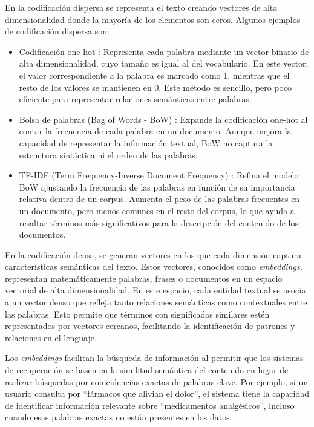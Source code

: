 En la codificación dispersa se representa el texto creando vectores de alta dimensionalidad donde la mayoría de los elementos son ceros. Algunos ejemplos de codificación dispersa son:
\begin{itemize} 
    \item Codificación one-hot \cite{harris2010digital}: Representa cada palabra mediante un vector binario de alta dimensionalidad, cuyo tamaño es igual al del vocabulario. En este vector, el valor correspondiente a la palabra es marcado como 1, mientras que el resto de los valores se mantienen en 0. Este método es sencillo, pero poco eficiente para representar relaciones semánticas entre palabras.
    \item Bolsa de palabras (Bag of Words - BoW) \cite{harris1954distributional}: Expande la codificación one-hot al contar la frecuencia de cada palabra en un documento. Aunque mejora la capacidad de representar la información textual, BoW no captura la estructura sintáctica ni el orden de las palabras. 
    \item TF-IDF (Term Frequency-Inverse Document Frequency) \cite{rajaraman2011data}: Refina el modelo BoW ajustando la frecuencia de las palabras en función de su importancia relativa dentro de un corpus. Aumenta el peso de las palabras frecuentes en un documento, pero menos comunes en el resto del corpus, lo que ayuda a resaltar términos más significativos para la descripción del contenido de los documentos. 
\end{itemize}

En la codificación densa, se generan vectores en los que cada dimensión captura características semánticas del texto. Estos vectores, conocidos como \textit{embeddings}, representan matemáticamente palabras, frases o documentos en un espacio vectorial de alta dimensionalidad. En este espacio, cada entidad textual se asocia a un vector denso que refleja tanto relaciones semánticas como contextuales entre las palabras. Esto permite que términos con significados similares estén representados por vectores cercanos, facilitando la identificación de patrones y relaciones en el lenguaje.

Los \textit{embeddings} facilitan la búsqueda de información al permitir que los sistemas de recuperación se basen en la similitud semántica del contenido en lugar de realizar búsquedas por coincidencias exactas de palabras clave. Por ejemplo, si un usuario consulta por ``fármacos que alivian el dolor'', el sistema tiene la capacidad de identificar información relevante sobre ``medicamentos analgésicos'', incluso cuando esas palabras exactas no están presentes en los datos.

